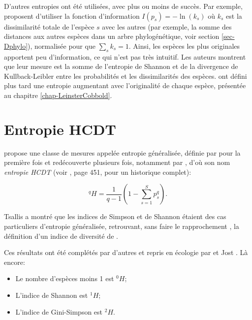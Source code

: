 \documentclass[
  11pt,
  american,
  a4paper,
  extrafontsizes,onecolumn,openright
  ]{memoir}
\providecommand{\tightlist}{%
  \setlength{\itemsep}{0pt}\setlength{\parskip}{0pt}}
\begin{document}
D'autres entropies ont été utilisées, avec plus ou moins de succès.
Par exemple, \textcite{Ricotta2003c} proposent d'utiliser la fonction d'information \(I(p_s) = -\ln(k_s)\) où \(k_s\) est la dissimilarité totale de l'espèce \(s\) avec les autres (par exemple, la somme des distances aux autres espèces dans un arbre phylogénétique, voir section \ref{sec-Dphylo}), normalisée pour que \(\sum_s{k_s} = 1\).
Ainsi, les espèces les plus originales apportent peu d'information, ce qui n'est pas très intuitif.
Les auteurs montrent que leur mesure est la somme de l'entropie de Shannon et de la divergence de Kullback-Leibler entre les probabilités et les dissimilarités des espèces.
\textcite{Ricotta2006b} ont défini plus tard une entropie augmentant avec l'originalité de chaque espèce, présentée au chapitre \ref{chap-LeinsterCobbold}.

\section{Entropie HCDT}\label{entropie-hcdt}

\textcite{Tsallis1988} propose une classe de mesures appelée entropie généralisée, définie par \textcite{Havrda1967} pour la première fois et redécouverte plusieurs fois, notamment par \textcite{Daroczy1970}, d'où son nom \emph{entropie HCDT} (voir \textcite{Mendes2008}, page 451, pour un historique complet):

\begin{equation}
  \label{eq:HCDT}
  ^{q}\!H = \frac{1}{q-1} \left( 1 - \sum^S_{s=1}{p^q_s} \right).
\end{equation}

Tsallis a montré que les indices de Simpson et de Shannon étaient des cas particuliers d'entropie généralisée, retrouvant, sans faire le rapprochement \autocite{Ricotta2005}, la définition d'un indice de diversité de \textcite{Patil1982}.

Ces résultats ont été complétés par d'autres et repris en écologie par \textcite{Keylock2005} et Jost \autocite*{Jost2006,Jost2007}.
Là encore:

\begin{itemize}
\tightlist
\item
  Le nombre d'espèces moins 1 est \(^{0}\!H\);
\item
  L'indice de Shannon est \(^{1}\!H\);
\item
  L'indice de Gini-Simpson est \(^{2}\!H\).
\end{itemize}
\end{document}
